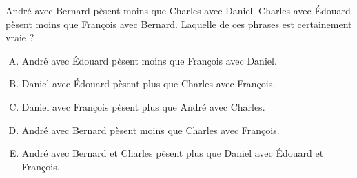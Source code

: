 André avec Bernard pèsent moins que Charles avec Daniel. Charles avec
Édouard pèsent moins que François avec Bernard. Laquelle de ces
phrases est certainement vraie ?
\begin{enumerate}[A)]
\item André avec Édouard pèsent moins que François avec Daniel.
\item Daniel avec Édouard pèsent plus que Charles avec François.
\item Daniel avec François pèsent plus que André avec Charles.
\item André avec Bernard pèsent moins que Charles avec François.
\item André avec Bernard et Charles pèsent plus que Daniel avec
  Édouard et François.
\end{enumerate}